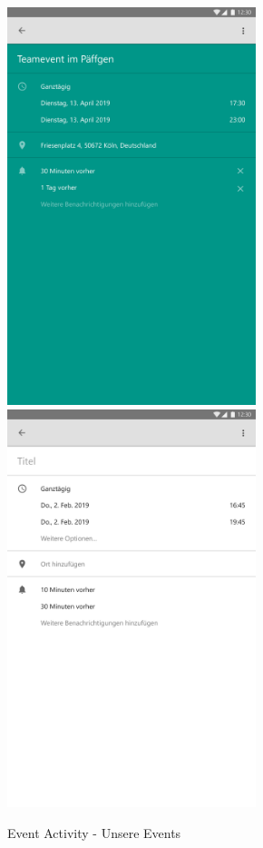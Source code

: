 \begin{figure}[H]
\caption{Event Activity - Unsere Events}
\centering
	\includegraphics[width=7.25cm]{img/EventActivity.pdf}
	\includegraphics[width=7.25cm]{img/EventActivityNew.pdf}
	\label{img:EventActivity}
\end{figure}

